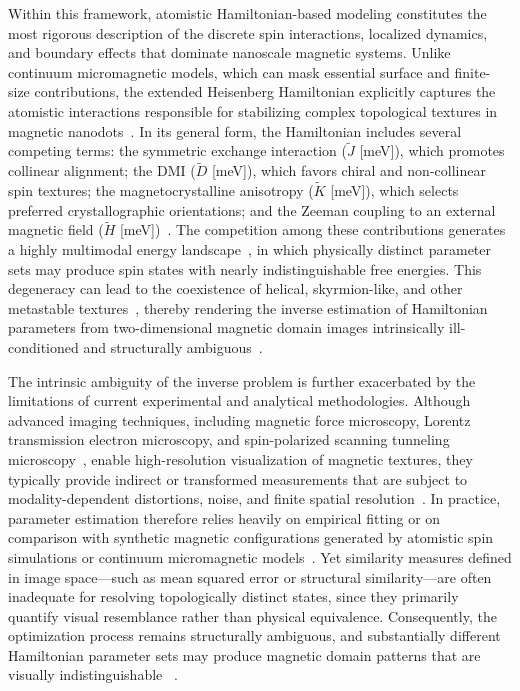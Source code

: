 \documentclass[final,5p,times,twocolumn]{elsarticle}
\begin{document}
Within this framework, atomistic Hamiltonian-based modeling constitutes the most rigorous description of the discrete spin interactions, localized dynamics, and boundary effects that dominate nanoscale magnetic systems. Unlike continuum micromagnetic models, which can mask essential surface and finite-size contributions, the extended Heisenberg Hamiltonian explicitly captures the atomistic interactions responsible for stabilizing complex topological textures in magnetic nanodots~\cite{evans2014atomistic}. In its general form, the Hamiltonian includes several competing terms: the symmetric exchange interaction ($\tilde{J}$ [meV]), which promotes collinear alignment; the DMI ($\tilde{D}$ [meV]), which favors chiral and non-collinear spin textures; the magnetocrystalline anisotropy ($\tilde{K}$ [meV]), which selects preferred crystallographic orientations; and the Zeeman coupling to an external magnetic field ($\tilde{H}$ [meV])~\cite{aldarawsheh2023intrinsic}. The competition among these contributions generates a highly multimodal energy landscape~\cite{tokura2020magnetic,finocchio2016magnetic}, in which physically distinct parameter sets may produce spin states with nearly indistinguishable free energies. This degeneracy can lead to the coexistence of helical, skyrmion-like, and other metastable textures~\cite{back20202020, he2023ferroelectrically}, thereby rendering the inverse estimation of Hamiltonian parameters from two-dimensional magnetic domain images intrinsically ill-conditioned and structurally ambiguous~\cite{murakami2022inverse, kwon2020magnetic}.

The intrinsic ambiguity of the inverse problem is further exacerbated by the limitations of current experimental and analytical methodologies. Although advanced imaging techniques, including magnetic force microscopy, Lorentz transmission electron microscopy, and spin-polarized scanning tunneling microscopy~\cite{nguyen2022cooperative}, enable high-resolution visualization of magnetic textures, they typically provide indirect or transformed measurements that are subject to modality-dependent distortions, noise, and finite spatial resolution~\cite{zhao2025overview, gaida2023lorentz}. In practice, parameter estimation therefore relies heavily on empirical fitting or on comparison with synthetic magnetic configurations generated by atomistic spin simulations or continuum micromagnetic models~\cite{d2023micromagnetic, lepadatu2021micromagnetic}. Yet similarity measures defined in image space—such as mean squared error or structural similarity—are often inadequate for resolving topologically distinct states, since they primarily quantify visual resemblance rather than physical equivalence. Consequently, the optimization process remains structurally ambiguous, and substantially different Hamiltonian parameter sets may produce magnetic domain patterns that are visually indistinguishable ~\cite{yin2023computational, karnatov2025analysis}.
\end{document}

